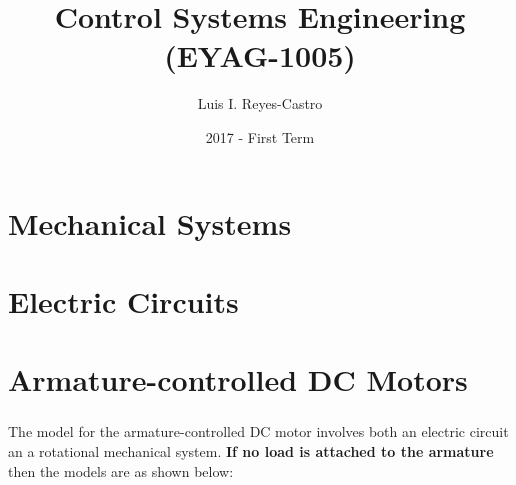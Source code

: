 \documentclass[ 10pt, xcolor = dvipsnames]{beamer}
\title[Control Systems]{Control Systems Engineering (EYAG-1005) }
\author[L. I. Reyes-Castro]{Luis I. Reyes-Castro}
\institute[ESPOL]{\normalsize Escuela Superior Polit\'ecnica del Litoral (ESPOL) \\ Guayaquil - Ecuador}
\date[2017-T1]{2017 - First Term}
\begin{document}


\section{Mechanical Systems}

\section{Electric Circuits}

\section{Armature-controlled DC Motors}

\begin{frame}[allowframebreaks]
\frametitle{\insertsection}

The model for the armature-controlled DC motor involves both an electric circuit an a rotational mechanical system. \textbf{If no load is attached to the armature} \linebreak then the models are as shown below: 
\halfskip

\begin{figure}[htb]
\centering
\def\svgwidth{0.9\columnwidth}

\end{figure}

\end{frame}
\end{document}
